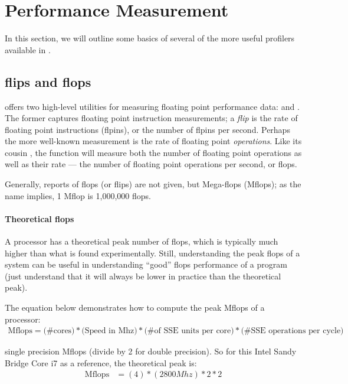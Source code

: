 \section{Performance Measurement}

In this section, we will outline some basics of several of the more useful 
profilers available in \thispackage.

\subsection{flips and flops}

\thispackage offers two high-level utilities for measuring floating point 
performance data:  and .  
The former captures floating point instruction measurements; a \textit{flip} is 
the rate of floating point instructions (flpins), or the number of flpins per 
second.  Perhaps the more well-known measurement is the rate of floating point 
\emph{operations}.  Like its cousin , the \thispackage 
function  will measure both the number of floating point 
operations as well as their rate --- the number of floating point operations 
per second, or flops.

Generally, reports of flops (or flips) are not given, but Mega-flops (Mflops); 
as the name implies, 1 Mflop is 1,000,000 flops.



\paragraph{Theoretical flops}

A processor has a theoretical peak number of flops, which is typically much 
higher than what is found experimentally.  Still, understanding the peak flops 
of a system can be useful in understanding ``good'' flops performance of a 
program (just understand that it will always be lower in practice than the 
theoretical peak).

The equation below demonstrates how to compute the peak Mflops of a processor:
\begin{align*}
\text{Mflops} = \text{(\# cores)} * \text{(Speed in Mhz)} *
\text{(\# of SSE units per core)} *  \text{(\# SSE operations per cycle)}
\end{align*}

single precision Mflops (divide by 2 for double precision).  So for this Intel 
Sandy Bridge Core i7 as a reference, the theoretical peak is:
\begin{align*}
\text{Mflops} &= (4) * (2800 Mhz) * 2 * 2
\end{align*}

